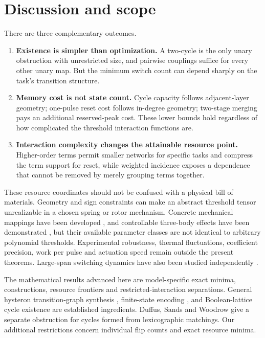 \documentclass[12pt,letterpaper]{article}
\theoremstyle{definition}\newtheorem{definition}[theorem]{Definition}
\theoremstyle{remark}\newtheorem{remark}[theorem]{Remark}
\begin{document}
\section{Discussion and scope}\label{sec:discussion}
There are three complementary outcomes.
\begin{enumerate}[label=\textbf{\arabic*.}]
\item \textbf{Existence is simpler than optimization.} A two-cycle is the only unary obstruction with unrestricted size, and pairwise couplings suffice for every other unary map. But the minimum switch count can depend sharply on the task's transition structure.
\item \textbf{Memory cost is not state count.} Cycle capacity follows adjacent-layer geometry; one-pulse reset cost follows in-degree geometry; two-stage merging pays an additional reserved-peak cost. These lower bounds hold regardless of how complicated the threshold interaction functions are.
\item \textbf{Interaction complexity changes the attainable resource point.} Higher-order terms permit smaller networks for specific tasks and compress the term support for reset, while weighted incidence exposes a dependence that cannot be removed by merely grouping terms together.
\end{enumerate}

These resource coordinates should not be confused with a physical bill of materials. Geometry and sign constraints can make an abstract threshold tensor unrealizable in a chosen spring or rotor mechanism. Concrete mechanical mappings have been developed \citep{shohat2025,paulsen2026}, and controllable three-body effects have been demonstrated \citep{ali2026}, but their available parameter classes are not identical to arbitrary polynomial thresholds. Experimental robustness, thermal fluctuations, coefficient precision, work per pulse and actuation speed remain outside the present theorems. Large-span switching dynamics have also been studied independently \citep{teunisse2026span}.

The mathematical results advanced here are model-specific exact minima, constructions, resource frontiers and restricted-interaction separations. General hysteron transition-graph synthesis \citep{teunisse2025}, finite-state encoding \citep{ahmad2000}, and Boolean-lattice cycle existence \citep{mutzesu2017,mutze2016} are established ingredients. Duffus, Sands and Woodrow \citep{duffus1988} give a separate obstruction for cycles formed from lexicographic matchings. Our additional restrictions concern individual flip counts and exact resource minima.
\end{document}
